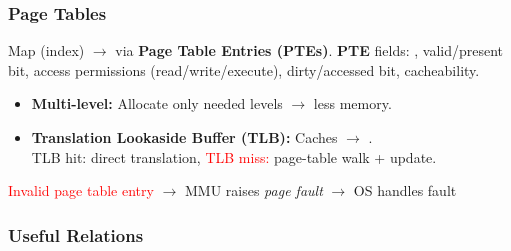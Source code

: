   \subsubsection{Page Tables}
    Map  (index) $\rightarrow$  via \textbf{Page Table Entries (PTEs)}.
    \textbf{PTE} fields: , valid/present bit, access permissions (read/write/execute), dirty/accessed bit, cacheability.
    \begin{itemize}
      \item \textbf{Multi-level:} Allocate only needed levels $\rightarrow$ less memory.
      \item \textbf{Translation Lookaside Buffer (TLB):} Caches  $\rightarrow$ .\\
      \textcolor{codeGreen}{TLB hit:} direct translation, \textcolor{red}{TLB miss:} page-table walk + update.
    \end{itemize}

    \textcolor{red}{Invalid page table entry} $\rightarrow$ MMU raises \emph{page fault} $\rightarrow$ OS handles fault

  





\subsubsection{Useful Relations}


